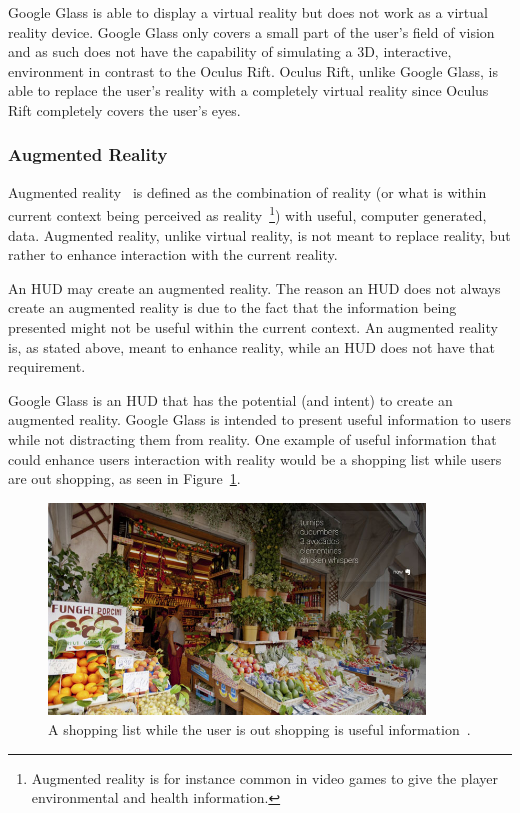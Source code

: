 Google Glass is able to display a virtual reality but does not work as a virtual reality device. Google Glass only covers a small part of the user's field of vision and as such does not have the capability of simulating a 3D, interactive, environment in contrast to the Oculus Rift. Oculus Rift, unlike Google Glass, is able to replace the user's reality with a completely virtual reality since Oculus Rift completely covers the user's eyes.

\subsubsection{Augmented Reality}
\label{subsubsec:ar}
Augmented reality~\cite{augmentedRealityDef} is defined as the combination of reality (or what is within current context being perceived as reality~\footnote{Augmented reality is for instance common in video games to give the player environmental and health information.}) with useful, computer generated, data. Augmented reality, unlike virtual reality, is not meant to replace reality, but rather to enhance interaction with the current reality.

An HUD may create an augmented reality. The reason an HUD does not always create an augmented reality is due to the fact that the information being presented might not be useful within the current context. An augmented reality is, as stated above, meant to enhance reality, while an HUD does not have that requirement.

Google Glass is an HUD that has the potential (and intent) to create an augmented reality. Google Glass is intended to present useful information to users while not distracting them from reality. One example of useful information that could enhance users interaction with reality would be a shopping list while users are out shopping, as seen in Figure~\ref{GlassShopping}.

	\begin{figure}[ht!]
		\centering
		\includegraphics[width=100mm]{images/GoogleGlassKeepRevelant}
		\caption{A shopping list while the user is out shopping is useful information~\cite{glassDesignPrinciples}.}
		\label{GlassShopping}
	\end{figure}
	
